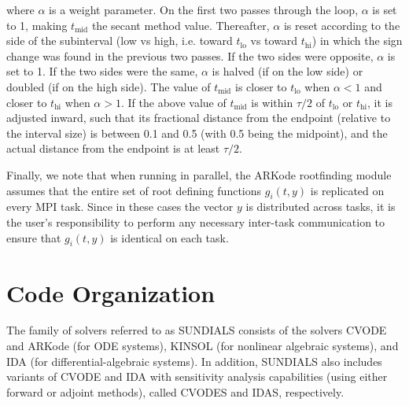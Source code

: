 \documentclass[letterpaper,10pt,english]{sphinxmanual}
\begin{document}
where \(\alpha\) is a weight parameter. On the first two passes
through the loop, \(\alpha\) is set to 1, making \(t_\text{mid}\)
the secant method value. Thereafter, \(\alpha\) is reset according
to the side of the subinterval (low vs high, i.e. toward
\(t_\text{lo}\) vs toward \(t_\text{hi}\)) in which the sign change was
found in the previous two passes. If the two sides were opposite,
\(\alpha\) is set to 1. If the two sides were the same, \(\alpha\)
is halved (if on the low side) or doubled (if on the high side). The
value of \(t_\text{mid}\) is closer to \(t_\text{lo}\) when
\(\alpha < 1\) and closer to \(t_\text{hi}\) when \(\alpha > 1\).
If the above value of \(t_\text{mid}\) is within \(\tau /2\) of
\(t_\text{lo}\) or \(t_\text{hi}\), it is adjusted inward, such that its
fractional distance from the endpoint (relative to the interval size)
is between 0.1 and 0.5 (with 0.5 being the midpoint), and the actual
distance from the endpoint is at least \(\tau/2\).

Finally, we note that when running in parallel, the ARKode rootfinding
module assumes that the entire set of root defining functions
\(g_i(t,y)\) is replicated on every MPI task.  Since in these
cases the vector \(y\) is distributed across tasks, it is the
user's responsibility to perform any necessary inter-task
communication to ensure that \(g_i(t,y)\) is identical on each task.


\chapter{Code Organization}
\label{Organization:organization}\label{Organization::doc}\label{Organization:code-organization}
The family of solvers referred to as SUNDIALS consists of the solvers
CVODE and ARKode (for ODE systems), KINSOL (for nonlinear algebraic
systems), and IDA (for differential-algebraic systems).  In addition,
SUNDIALS also includes variants of CVODE and IDA with sensitivity analysis
capabilities (using either forward or adjoint methods), called CVODES and
IDAS, respectively.
\end{document}
